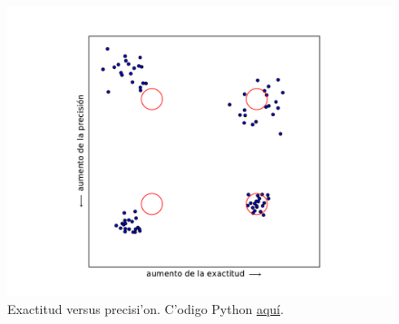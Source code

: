 \documentclass[a4paper]{report}
\begin{document}
\begin{figure}[h!]
\begin{center}
\includegraphics[width=12cm]{figs/fig-ex-vs-prec.pdf}
\caption{Exactitud versus precisi'on. C'odigo Python \href{https://github.com/gfrubi/Lab/blob/master/python/fig-ex-vs-prec.py}{aqu\'i}.}
\end{center}
\end{figure}
\end{document}
